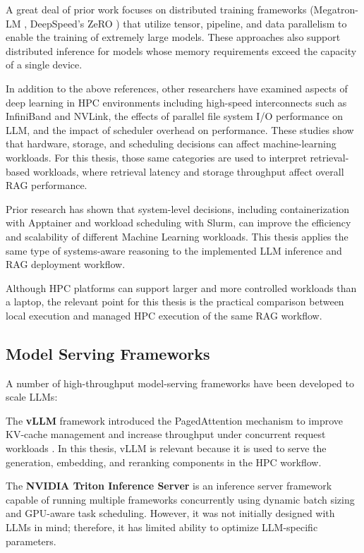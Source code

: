 A great deal of prior work focuses on distributed training frameworks (Megatron-LM \cite{shoeybi2019megatron}, DeepSpeed's ZeRO \cite{rajbhandari2020deepspeed}) that utilize tensor, pipeline, and data parallelism to enable the training of extremely large models. These approaches also support distributed inference for models whose memory requirements exceed the capacity of a single device.

In addition to the above references, other researchers have examined aspects of deep learning in \ac{HPC} environments including high-speed interconnects such as InfiniBand and NVLink, the effects of parallel file system \ac{I/O} performance on \ac{LLM}, and the impact of scheduler overhead on performance. These studies show that hardware, storage, and scheduling decisions can affect machine-learning workloads. For this thesis, those same categories are used to interpret retrieval-based workloads, where retrieval latency and storage throughput affect overall \ac{RAG} performance.

Prior research has shown that system-level decisions, including containerization with Apptainer and workload scheduling with Slurm, can improve the efficiency and scalability of different Machine Learning workloads. This thesis applies the same type of systems-aware reasoning to the implemented \ac{LLM} inference and \ac{RAG} deployment workflow.

Although \ac{HPC} platforms can support larger and more controlled workloads than a laptop, the relevant point for this thesis is the practical comparison between local execution and managed \ac{HPC} execution of the same \ac{RAG} workflow.

\subsection{Model Serving Frameworks}

A number of high-throughput model-serving frameworks have been developed to scale \acp{LLM}:

The \textbf{\acf{vLLM}} framework introduced the PagedAttention mechanism to improve \ac{KV}-cache management and increase throughput under concurrent request workloads \cite{kwon2023vllm}. In this thesis, \ac{vLLM} is relevant because it is used to serve the generation, embedding, and reranking components in the \ac{HPC} workflow.

The \textbf{NVIDIA Triton Inference Server} is an inference server framework capable of running multiple frameworks concurrently using dynamic batch sizing and GPU-aware task scheduling. However, it was not initially designed with \acp{LLM} in mind; therefore, it has limited ability to optimize \ac{LLM}-specific parameters.

